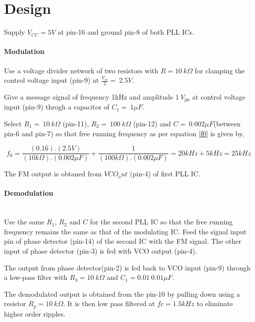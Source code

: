  
\section*{Design}

Supply $V_{CC}=5V$ at pin-16 and ground pin-8 of both  PLL ICs.

\paragraph{Modulation}


\noindent Use a voltage divider network of two resistors with $ R=10\ k\Omega$  for clamping the control voltage input (pin-9) at $\frac{V_{cc}}{2}=\ 2.5V$. 


\noindent Give a message signal of frequency 1kHz and amplitude  $1\ V_{pp}$ at control voltage input (pin-9) throgh a capacitor of $C_1=\ 1\mu F$.


\noindent Select $R_1=\ 10\ k\Omega$ (pin-11),   $R_2=\ 100\ k\Omega$ (pin-12) and $C=\  0.002 \mu F$(between pin-6 and pin-7) so that free running frequency as per equation \ref{f0} is given by,

\begin{equation}
f_0 =\frac{(0.16 ). (2.5V)}{(10k\Omega).(0.002\mu F)}+\frac{1}{(100k\Omega).(0.002\mu F)}=20 kHz+5 kHz=25 kHz
\end{equation}
 
\noindent The FM output is obtaned from $VCO_out$ (pin-4) of first PLL IC.

\paragraph{Demodulation}
\\


\noindent Use the same $R_1$, $R_2$ and $C$ for the second PLL IC so that the free running frequency remains the same as that of the modulating IC. 
Feed the signal input pin of phase detector (pin-14) of the second IC with the FM signal. The other input of phase detector (pin-3) is fed with VCO output (pin-4).

\noindent The output from phase detector(pin-2)  is fed back to  VCO input (pin-9) through a low-pass filter with $R_3=10\ k\Omega$ and $C_1=0.01\ 0.01\mu F$. 

\noindent The demodulated output is obtained from the pin-10 by pulling down using a resistor $R_p=10 \ k\Omega$. It is then low pass filtered at $fc=1.5 kHz$ to eliminate higher order ripples.

